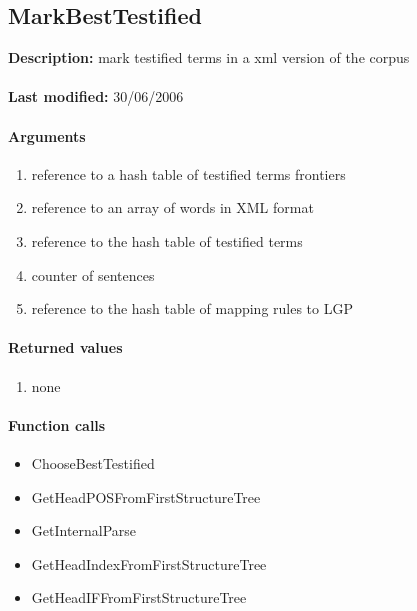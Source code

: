 \subsection{MarkBestTestified}
\textbf{Description:} mark testified terms in a xml version of the corpus\\
\\\textbf{Last modified:} 30/06/2006

\paragraph{Arguments}
\begin{enumerate}
\item reference to a hash table of testified terms frontiers
\item reference to an array of words in XML format
\item reference to the hash table of testified terms
\item counter of sentences
\item reference to the hash table of mapping rules to LGP
\end{enumerate}

\paragraph{Returned values}
\begin{enumerate}
\item none
\end{enumerate}

\paragraph{Function calls}
\begin{itemize}
\item ChooseBestTestified
\item GetHeadPOSFromFirstStructureTree
\item GetInternalParse
\item GetHeadIndexFromFirstStructureTree
\item GetHeadIFFromFirstStructureTree
\end{itemize}

